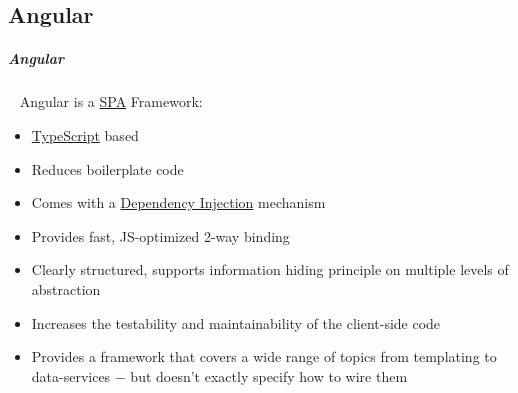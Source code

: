 \documentclass[11pt,twoside,landscape]{article}
\begin{document}
\begin{multicols}{3}
\section{Angular}
\label{sec:org8b0d202}
\subparagraph{Angular} \
\label{sec:orgc799c9c}
Angular is a \href{../../../roam/20231228102611-what_is_a_single_page_application.org}{SPA} Framework:
\begin{itemize}
\item \href{../../../roam/20240108134405-typescript.org}{TypeScript} based
\item Reduces boilerplate code
\item Comes with a \href{../../../roam/20200904154006-dependency_injection.org}{Dependency Injection} mechanism
\item Provides fast, JS-optimized 2-way binding
\item Clearly structured, supports information hiding principle on multiple levels of abstraction
\item Increases the testability and maintainability of the client-side code
\item Provides a framework that covers a wide range of topics from templating to data-services
− but doesn’t exactly specify how to wire them
\end{itemize}


\end{multicols}
\end{document}
